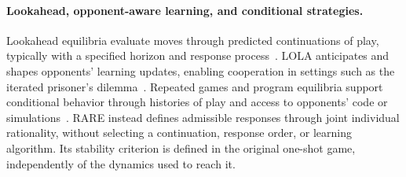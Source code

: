 \paragraph{Lookahead, opponent-aware learning, and conditional strategies.}
Lookahead equilibria evaluate moves through predicted continuations of
play, typically with a specified horizon and response
process~\cite{MirrokniThainVetta2012,BiloFanelliMoscardelli2017}.
LOLA anticipates and shapes opponents' learning updates, enabling
cooperation in settings such as the iterated prisoner's
dilemma~\cite{FoersterEtAl2018LOLA}.
Repeated games and program equilibria support conditional behavior
through histories of play and access to opponents' code or
simulations~\cite{FudenbergMaskin1986,Tennenholtz2004,Cooper2025}.
RARE instead defines admissible responses through joint individual
rationality, without selecting a continuation, response order, or
learning algorithm.
Its stability criterion is defined in the original one-shot game,
independently of the dynamics used to reach it.
